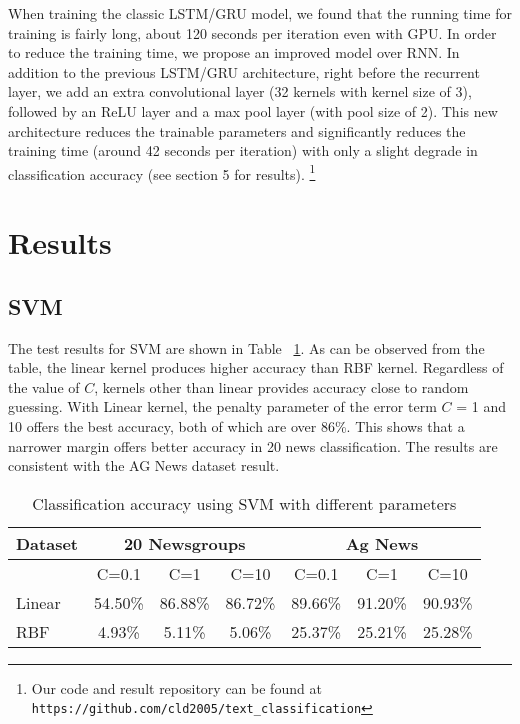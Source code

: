 \documentclass{article}
\begin{document}
When training the classic LSTM/GRU model, we found that the running time for training is fairly long, about 120 seconds per iteration even with GPU. In order to reduce the training time, we propose an improved model over RNN. In addition to the previous LSTM/GRU architecture, right before the recurrent layer, we add an extra convolutional layer (32 kernels with kernel size of 3), followed by an ReLU layer and a max pool layer (with pool size of 2). This new architecture reduces the trainable parameters and significantly reduces the training time (around 42 seconds per iteration) with only a slight degrade in classification accuracy (see section 5 for results). \footnote{Our code and result repository can be found at \texttt{https://github.com/cld2005/text\_classification}}



\section{Results}

\subsection{SVM}
The test results for SVM are shown in Table ~\ref{Tab1}. As can be observed from the table, the linear kernel produces higher accuracy than RBF kernel. Regardless of the value of $C$, kernels other than linear provides accuracy close to random guessing. With Linear kernel, the penalty parameter of the error term $C$ = 1 and 10 offers the best accuracy, both of which are over 86\%. This shows that a narrower margin offers better accuracy in 20 news classification. The results are consistent with the AG News dataset result.

\begin{table}[h!]
  \begin{center}
    \begin{tabular}{| l | c | c | c | c | c | c |}
      \hline
      Dataset & \multicolumn{3}{c|}{20 Newsgroups} & \multicolumn{3}{c|}{Ag News} \\ \hline
      & C=0.1 & C=1 & C=10 & C=0.1 & C=1 & C=10 \\ \hline
      Linear & 54.50\% & 86.88\% & 86.72\% & 89.66\% & 91.20\% & 90.93\% \\ \hline
      RBF & 4.93\% & 5.11\% & 5.06\% & 25.37\% & 25.21\% & 25.28\% \\ \hline
    \end{tabular}
    \caption{\small Classification accuracy using SVM with different parameters}
    \label{Tab1}
  \end{center}
\end{table}
\end{document}
